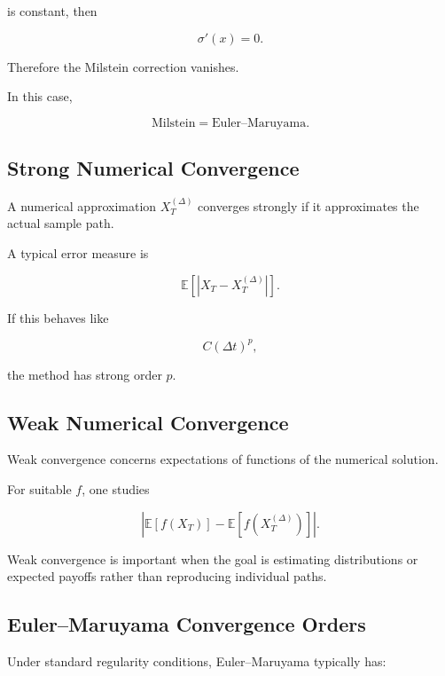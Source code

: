 is constant, then

\[
\sigma'(x)=0.
\]

Therefore the Milstein correction vanishes.

In this case,

\[
\boxed{
\text{Milstein}
=
\text{Euler--Maruyama}.
}
\]

\subsection{Strong Numerical Convergence}
\label{subsec:strong-numerical-convergence}

A numerical approximation \(X_T^{(\Delta)}\) converges strongly if it
approximates the actual sample path.

A typical error measure is

\[
\boxed{
\mathbb{E}
\left[
|X_T-X_T^{(\Delta)}|
\right].
}
\]

If this behaves like

\[
C(\Delta t)^p,
\]

the method has strong order \(p\).

\subsection{Weak Numerical Convergence}
\label{subsec:weak-numerical-convergence}

Weak convergence concerns expectations of functions of the numerical
solution.

For suitable \(f\), one studies

\[
\boxed{
\left|
\mathbb{E}[f(X_T)]
-
\mathbb{E}
[
f(X_T^{(\Delta)})
]
\right|.
}
\]

Weak convergence is important when the goal is estimating distributions
or expected payoffs rather than reproducing individual paths.

\subsection{Euler--Maruyama Convergence Orders}
\label{subsec:euler-maruyama-orders}

Under standard regularity conditions, Euler--Maruyama typically has:

